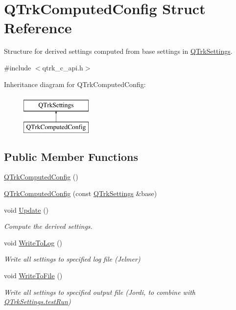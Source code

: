 \hypertarget{struct_q_trk_computed_config}{}\section{Q\+Trk\+Computed\+Config Struct Reference}
\label{struct_q_trk_computed_config}


Structure for derived settings computed from base settings in \hyperlink{struct_q_trk_settings}{Q\+Trk\+Settings}.  




{\ttfamily \#include $<$qtrk\+\_\+c\+\_\+api.\+h$>$}

Inheritance diagram for Q\+Trk\+Computed\+Config\+:\begin{figure}[H]
\begin{center}
\leavevmode
\includegraphics[height=2.000000cm]{struct_q_trk_computed_config}
\end{center}
\end{figure}
\subsection*{Public Member Functions}
\begin{DoxyCompactItemize}
\item 
\hyperlink{struct_q_trk_computed_config_ad738ca026c9b8b214c45dbffa71be9bf}{Q\+Trk\+Computed\+Config} ()
\item 
\hyperlink{struct_q_trk_computed_config_aa129e2fc92125cfe3e3e54bdc22b0872}{Q\+Trk\+Computed\+Config} (const \hyperlink{struct_q_trk_settings}{Q\+Trk\+Settings} \&base)
\item 
void \hyperlink{struct_q_trk_computed_config_a26980879d30db548c6b2a2589616d7ee}{Update} ()
\begin{DoxyCompactList}\small\item\em Compute the derived settings. \end{DoxyCompactList}\item 
void \hyperlink{struct_q_trk_computed_config_a032b48136d299b59fe90b35ad0ade0a2}{Write\+To\+Log} ()
\begin{DoxyCompactList}\small\item\em Write all settings to specified log file (Jelmer) \end{DoxyCompactList}\item 
void \hyperlink{struct_q_trk_computed_config_a824634b46aeafc68c21d5951f92495c3}{Write\+To\+File} ()
\begin{DoxyCompactList}\small\item\em Write all settings to specified output file (Jordi, to combine with \hyperlink{struct_q_trk_settings_aef52bd8e2fdba83af4ce3b4367180d9f}{Q\+Trk\+Settings.\+test\+Run}) \end{DoxyCompactList}\end{DoxyCompactItemize}
